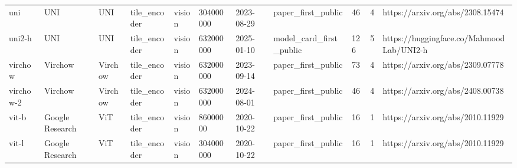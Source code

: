 \begin{longtable}{lllllllllll}
uni & UNI & UNI & tile\_encoder & vision & 304000000 & 2023-08-29 & paper\_first\_public & 46 & 4 & https://arxiv.org/abs/2308.15474 \\
uni2-h & UNI & UNI & tile\_encoder & vision & 632000000 & 2025-01-10 & model\_card\_first\_public & 126 & 5 & https://huggingface.co/MahmoodLab/UNI2-h \\
virchow & Virchow & Virchow & tile\_encoder & vision & 632000000 & 2023-09-14 & paper\_first\_public & 73 & 4 & https://arxiv.org/abs/2309.07778 \\
virchow-2 & Virchow & Virchow & tile\_encoder & vision & 632000000 & 2024-08-01 & paper\_first\_public & 46 & 4 & https://arxiv.org/abs/2408.00738 \\
vit-b & Google Research & ViT & tile\_encoder & vision & 86000000 & 2020-10-22 & paper\_first\_public & 16 & 1 & https://arxiv.org/abs/2010.11929 \\
vit-l & Google Research & ViT & tile\_encoder & vision & 304000000 & 2020-10-22 & paper\_first\_public & 16 & 1 & https://arxiv.org/abs/2010.11929 \\
\end{longtable}
